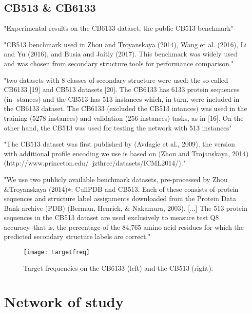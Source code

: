 \subsection{CB513 \& CB6133}
"Experimental results on the CB6133 dataset, the public CB513 benchmark" \cite{Li2016}

"CB513 benchmark used in Zhou and Troyanskaya (2014), Wang et al. (2016), Li and Yu (2016), and Busia and Jaitly (2017). This benchmark was widely used and was chosen from secondary structure tools for performance comparison." \cite{Fang2017}

"two datasets with 8 classes of secondary structure were used: the so-called CB6133 [19] and CB513 datasets [20]. The CB6133 has 6133 protein sequences (in- stances) and the CB513 has 513 instances which, in turn, were included in the CB6133 dataset. The CB6133 (excluded the CB513 intances) was used in the training (5278 instances) and validation (256 instances) tasks, as in [16]. On the other hand, the CB513 was used for testing the network with 513 instances" \cite{Hattori2017}

"The CB513 dataset was first published by (Avdagic et al., 2009), the version with additional profile encoding we use is based on (Zhou and  Trojanskaya, 2014) (http://www.princeton.edu/~jzthree/datasets/ICML2014/)." \cite{Jurtz2017}

"We use two publicly available benchmark datasets, pre-processed by Zhou \&Troyanskaya (2014)∗: CullPDB and CB513. Each of these consists of protein sequences and structure label assignments downloaded from the Protein Data Bank archive (PDB) (Berman, Henrick, \& Nakamura, 2003). [...] The 513 protein sequences in the CB513 dataset are used exclusively to measure test Q8 accuracy–that is, the percentage of the 84,765 amino acid residues for which the predicted secondary structure labels are correct." \cite{Busia2017}

\begin{figure}[h]
	\centering
	\texttt{[image: targetfreq]}
	\caption{Target frequencies on the CB6133 (left) and the CB513 (right).}
	\label{fig:targetfreq}
\end{figure}


\section{Network of study}

